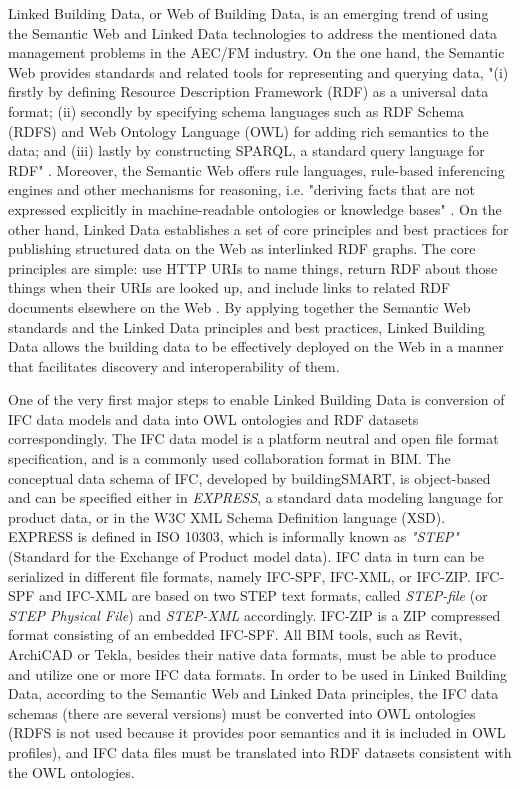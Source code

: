 Linked Building Data, or Web of Building Data, is an emerging trend of using the Semantic Web and Linked Data technologies to address the mentioned data management problems in the AEC/FM industry.
On the one hand, the Semantic Web provides standards and related tools for representing and querying data, "(i) firstly by defining Resource Description Framework (RDF) as a universal data format; (ii) secondly by specifying schema languages such as RDF Schema (RDFS) and Web Ontology Language (OWL) for adding rich semantics to the data; and (iii) lastly by constructing SPARQL, a standard query language for RDF" \cite{polleres2013rdfs}.
Moreover, the Semantic Web offers rule languages, rule-based inferencing engines and other mechanisms for reasoning, i.e. "deriving facts that are not expressed explicitly in machine-readable ontologies or knowledge bases" \cite{sikos2015mastering}.
On the other hand, Linked Data establishes a set of core principles and best practices for publishing structured data on the Web as interlinked RDF graphs.
The core principles are simple: use HTTP URIs to name things, return RDF about those things when their URIs are looked up, and include links to related RDF documents elsewhere on the Web \cite{bizer2009linked, hogan2014linked, polleres2013rdfs}.
By applying together the Semantic Web standards and the Linked Data principles and best practices, Linked Building Data allows the building data to be effectively deployed on the Web in a manner that facilitates discovery and interoperability of them.




One of the very first major steps to enable Linked Building Data is conversion of IFC data models and data into OWL ontologies and RDF datasets correspondingly.
The IFC data model is a platform neutral and open file format specification, and is a commonly used collaboration format in BIM.
The conceptual data schema of IFC, developed by buildingSMART, is object-based and can be specified either in \emph{EXPRESS}, a standard data modeling language for product data, or in the W3C XML Schema Definition language (XSD).
EXPRESS is defined in ISO 10303, which is informally known as \emph{"STEP"} (Standard for the Exchange of Product model data).
IFC data in turn can be serialized in different file formats, namely IFC-SPF, IFC-XML, or IFC-ZIP.
IFC-SPF and IFC-XML are based on two STEP text formats, called \emph{STEP-file} (or \emph{STEP Physical File}) and \emph{STEP-XML} accordingly. 
IFC-ZIP is a ZIP compressed format consisting of an embedded IFC-SPF.
All BIM tools, such as Revit, ArchiCAD or Tekla, besides their native data formats, must be able to produce and utilize one or more IFC data formats.
In order to be used in Linked Building Data, according to the Semantic Web and Linked Data principles, the IFC data schemas (there are several versions) must be converted into OWL ontologies (RDFS is not used because it provides poor semantics and it is included in OWL profiles), and IFC data files must be translated into RDF datasets consistent with the OWL ontologies.




